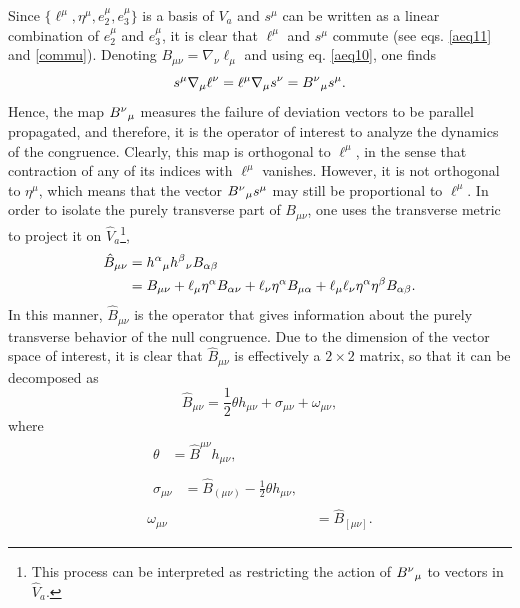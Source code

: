 \documentclass[
12pt,		%
openright,	%
twoside,  %
a4paper,			%
chapter=TITLE,		%
english,			%
french,				%
spanish,			%
brazil				%
]{USPSC-classe/USPSC}
\begin{document}
Since $\{\ell^{\mu},\eta^{\mu},e^{\mu}_2,e^{\mu}_3\}$ is a basis of $V_a$ and $s^{\mu}$ can be written as a linear combination of $e^{\mu}_2$ and $e^{\mu}_3$, it is clear that $\ell^{\mu}$ and $s^{\mu}$ commute (see eqs. \ref{aeq11} and \ref{commu}). Denoting $B_{\mu\nu}=\nabla_{\nu}\ell_{\mu}$ and using eq. \ref{aeq10}, one finds 
\begin{equation}
    s^{\mu}\nabla_{\mu}\ell^{\nu}=\ell^{\mu}\nabla_{\mu}s^{\nu}=B^{\nu}\mathstrut_{\mu}s^{\mu}.
\end{equation}
Hence, the map $B^{\nu}\mathstrut_{\mu}$ measures the failure of deviation vectors to be parallel propagated, and therefore, it is the operator of interest to analyze the dynamics of the congruence. Clearly, this map is orthogonal to $\ell^{\mu}$, in the sense that contraction of any of its indices with $\ell^{\mu}$ vanishes. However, it is not orthogonal to $\eta^{\mu}$, which means that the vector $B^{\nu}\mathstrut_{\mu}s^{\mu}$ may still be proportional to $\ell^{\mu}$. In order to isolate the purely transverse part of $B_{\mu\nu}$, one uses the transverse metric to project it on $\hat{V}_a$\footnote{This process can be interpreted as restricting the action of $B^{\nu}\mathstrut_{\mu}$ to vectors in $\hat{V}_a$.},
\begin{equation}\label{bhat}
\begin{aligned}[b]
    \hat{B}_{\mu\nu}& =h^{\alpha}\mathstrut_{\mu}h^{\beta}\mathstrut_{\nu}B_{\alpha\beta}\\
    &= B_{\mu\nu}+\ell_{\mu}\eta^{\alpha}B_{\alpha\nu}+\ell_{\nu}\eta^{\alpha}B_{\mu\alpha}+\ell_{\mu}\ell_{\nu}\eta^{\alpha}\eta^{\beta}B_{\alpha\beta}.
    \end{aligned}
\end{equation}
In this manner, $\hat{B}_{\mu\nu}$ is the operator that gives information about the purely transverse behavior of the null congruence. Due to the dimension of the vector space of interest, it is clear that $\hat{B}_{\mu\nu}$ is effectively a $2\times2$ matrix, so that it can be decomposed as
\begin{equation}\label{B}
    \hat{B}_{\mu\nu}=\frac{1}{2}\theta h_{\mu\nu}+\sigma_{\mu\nu}+\omega_{\mu\nu},
\end{equation}
where
\begin{align}
\begin{split}
    \theta& =\hat{B}^{\mu\nu}h_{\mu\nu},
\end{split}\\
\begin{split}
    \sigma_{\mu\nu}& =\hat{B}_{(\mu\nu)}-\frac{1}{2}\theta h_{\mu\nu},
\end{split}\\
    \omega_{\mu\nu}& =\hat{B}_{[\mu\nu]}.
\end{align}
\end{document}
